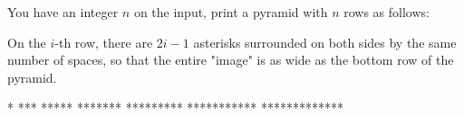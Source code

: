 




You have an integer $n$ on the input, print a pyramid with $n$ rows as follows:

On the $i$-th row, there are $2i-1$ asterisks surrounded on both sides by the same number of spaces, so that the entire "image" is as wide as the bottom row of the pyramid.

\vystup
      *      
     ***     
    *****    
   *******   
  *********  
 *********** 
*************
\koniec

